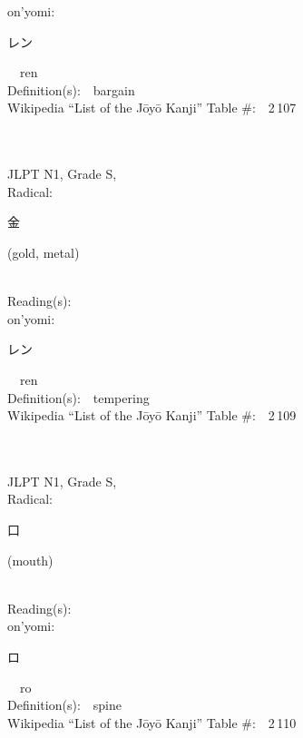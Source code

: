 \begin{multicols}{2}
{\hspace*{1em}}on'yomi:\ \ \\
{\hspace*{2em}}{\begin{CJK}{UTF8}{min} レン \end{CJK}}\ \ ren\ \ \\
Definition(s):\ \ bargain \\
Wikipedia ``List of the J\=oy\=o Kanji'' Table \#:\ \ 2\,107 \\
\ \ \\
{\fontsize{34pt}{40pt}  }\ \ \\
{JLPT N1, Grade S, \\Radical:\ \ {\begin{CJK}{UTF8}{min} 金 \end{CJK}} (gold, metal) } \\
Reading(s):\ \ \\
{\hspace*{1em}}on'yomi:\ \ \\
{\hspace*{2em}}{\begin{CJK}{UTF8}{min} レン \end{CJK}}\ \ ren\ \ \\
Definition(s):\ \ tempering \\
Wikipedia ``List of the J\=oy\=o Kanji'' Table \#:\ \ 2\,109 \\
\ \ \\
{\fontsize{34pt}{40pt}  }\ \ \\
{JLPT N1, Grade S, \\Radical:\ \ {\begin{CJK}{UTF8}{min} 口 \end{CJK}} (mouth) } \\
Reading(s):\ \ \\
{\hspace*{1em}}on'yomi:\ \ \\
{\hspace*{2em}}{\begin{CJK}{UTF8}{min} ロ \end{CJK}}\ \ ro\ \ \\
Definition(s):\ \ spine \\
Wikipedia ``List of the J\=oy\=o Kanji'' Table \#:\ \ 2\,110 \\

\end{multicols}
